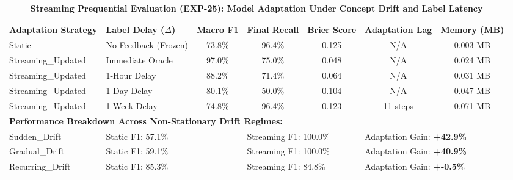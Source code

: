 \begin{table}[t]
\centering
\small
\caption{\textbf{Streaming Prequential Evaluation (EXP-25): Model Adaptation Under Concept Drift and Label Latency}}
\label{tab:prequential_drift}
\begin{tabular}{llccccc}
\toprule
\textbf{Adaptation Strategy} & \textbf{Label Delay ($\Delta$)} & \textbf{Macro F1} & \textbf{Final Recall} & \textbf{Brier Score} & \textbf{Adaptation Lag} & \textbf{Memory (MB)} \\
\midrule
Static & No Feedback (Frozen) & 73.8\% & 96.4\% & 0.125 & N/A & 0.003 MB \\
Streaming\_Updated & Immediate Oracle & 97.0\% & 75.0\% & 0.048 & N/A & 0.024 MB \\
Streaming\_Updated & 1-Hour Delay & 88.2\% & 71.4\% & 0.064 & N/A & 0.031 MB \\
Streaming\_Updated & 1-Day Delay & 80.1\% & 50.0\% & 0.104 & N/A & 0.047 MB \\
Streaming\_Updated & 1-Week Delay & 74.8\% & 96.4\% & 0.123 & 11 steps & 0.071 MB \\
\midrule
\multicolumn{7}{l}{\textbf{Performance Breakdown Across Non-Stationary Drift Regimes:}} \\
\quad Sudden\_Drift & \multicolumn{2}{l}{Static F1: 57.1\%} & \multicolumn{2}{l}{Streaming F1: 100.0\%} & \multicolumn{2}{l}{Adaptation Gain: \textbf{+42.9\%}} \\
\quad Gradual\_Drift & \multicolumn{2}{l}{Static F1: 59.1\%} & \multicolumn{2}{l}{Streaming F1: 100.0\%} & \multicolumn{2}{l}{Adaptation Gain: \textbf{+40.9\%}} \\
\quad Recurring\_Drift & \multicolumn{2}{l}{Static F1: 85.3\%} & \multicolumn{2}{l}{Streaming F1: 84.8\%} & \multicolumn{2}{l}{Adaptation Gain: \textbf{+-0.5\%}} \\
\bottomrule
\end{tabular}
\end{table}
